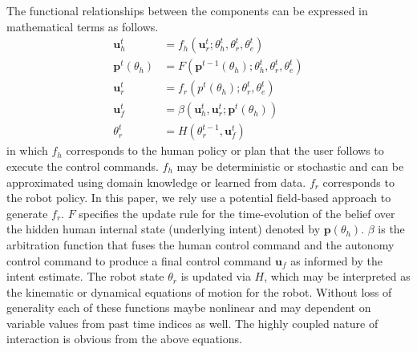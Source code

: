 \documentclass[letterpaper, 10 pt, conference]{ieeeconf}  %
\begin{document}
The functional relationships between the components can be expressed in mathematical terms as follows.
\begin{align*}
	\boldsymbol{u}_h^t &= f_h(\boldsymbol{u}_r^t;\theta_h^t,\theta_r^t,\theta_e^t ) \\
	\boldsymbol{p}^t(\theta_h) &= F(\boldsymbol{p}^{t-1}(\theta_h); \theta_h^t,\theta_r^t,\theta_e^t) \\ 
	\boldsymbol{u}_r^t &= f_r(p^t(\theta_h);\theta_r^t,\theta_e^t) \\
	\boldsymbol{u}_f^t &= \beta(\boldsymbol{u}_h^t,\boldsymbol{u}_r^t; \boldsymbol{p}^t(\theta_h))\\
	\theta_r^t &= H(\theta_r^{t-1}, \boldsymbol{u}_f^t)	
\end{align*}
in which $f_h$ corresponds to the human policy or plan that the user follows to execute the control commands. $f_h$ may be deterministic or stochastic and can be approximated using domain knowledge or learned from data. $f_r$ corresponds to the robot policy. In this paper, we rely use a potential field-based approach to generate $f_r$. $F$ specifies the update rule for the time-evolution of the belief over the hidden human internal state (underlying intent) denoted by $\boldsymbol{p}(\theta_h)$. $\beta$ is the arbitration function that fuses the human control command and the autonomy control command to produce a final control command $\boldsymbol{u}_f$ as informed by the intent estimate. The robot state $\theta_r$ is updated via $H$, which may be interpreted as the kinematic or dynamical equations of motion for the robot. Without loss of generality each of these functions maybe nonlinear and may dependent on variable values from past time indices as well. The highly coupled nature of interaction is obvious from the above equations. 



\end{document}
